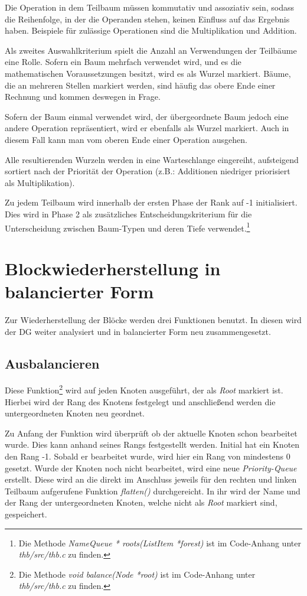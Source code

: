 Die Operation in dem Teilbaum müssen kommutativ und assoziativ sein, sodass die Reihenfolge, in der die Operanden stehen, keinen Einfluss auf das Ergebnis haben. Beispiele für zulässige Operationen sind die Multiplikation und Addition.

Als zweites Auswahlkriterium spielt die Anzahl an Verwendungen der Teilbäume eine Rolle. Sofern ein Baum mehrfach verwendet wird, und es die mathematischen Voraussetzungen besitzt, wird es als Wurzel markiert. Bäume, die an mehreren Stellen markiert werden, sind häufig das obere Ende einer Rechnung und kommen deswegen in Frage.

Sofern der Baum einmal verwendet wird, der übergeordnete Baum jedoch eine andere Operation repräsentiert, wird er ebenfalls als Wurzel markiert. Auch in diesem Fall kann man vom oberen Ende einer Operation ausgehen.

Alle resultierenden Wurzeln werden in eine Warteschlange eingereiht, aufsteigend sortiert nach der Priorität der Operation (z.B.: Additionen niedriger priorisiert als Multiplikation).

Zu jedem Teilbaum wird innerhalb der ersten Phase der Rank auf -1 initialisiert. Dies wird in Phase 2 als zusätzliches Entscheidungskriterium für die  Unterscheidung zwischen Baum-Typen und deren Tiefe verwendet.\footnote{Die Methode \textit{NameQueue * roots(ListItem *forest)} ist im Code-Anhang unter \textit{thb/src/thb.c} zu finden.}

\section{Blockwiederherstellung in balancierter Form}
Zur Wiederherstellung der Blöcke werden drei Funktionen benutzt. In diesen wird der \ac{DG} weiter analysiert und in balancierter Form neu zusammengesetzt.

\subsection{Ausbalancieren}
Diese Funktion\footnote{Die Methode \textit{void balance(Node *root)} ist im Code-Anhang unter \textit{thb/src/thb.c} zu finden.} wird auf jeden Knoten ausgeführt, der als \textit{Root} markiert ist. Hierbei wird der Rang des Knotens festgelegt und anschließend werden die untergeordneten Knoten neu geordnet.

Zu Anfang der Funktion wird überprüft ob der aktuelle Knoten schon bearbeitet wurde. Dies kann anhand seines Rangs festgestellt werden. Initial hat ein Knoten den Rang -1. Sobald er bearbeitet wurde, wird hier ein Rang von mindestens 0 gesetzt. Wurde der Knoten noch nicht bearbeitet, wird eine neue \textit{Priority-Queue} erstellt. Diese wird an die direkt im Anschluss jeweils für den rechten und linken Teilbaum aufgerufene Funktion \textit{flatten()} durchgereicht. In ihr wird der Name und der Rang der untergeordneten Knoten, welche nicht als \textit{Root} markiert sind, gespeichert.

